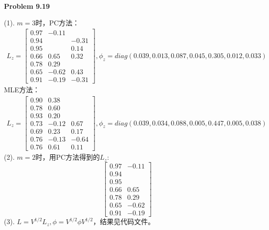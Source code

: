 \documentclass[UTF8,12pt]{article}
\newenvironment{problem}[2][Problem]
{ \begin{mdframed}[backgroundcolor=gray!20] \textbf{#1 #2}}
	{  \end{mdframed}}
\newenvironment{answer}
{%
}
{}
\newenvironment{eq}
{
	\begin{equation}
		\begin{aligned}\nonumber
}
{
		\end{aligned}
	\end{equation}
}
\begin{document}
\renewcommand{\qed}{\quad\qedsymbol}
\begin{problem}{9.19}
\end{problem}
\begin{answer}
	(1). $m=3$时，PC方法：
	\begin{eq}
		L_z = \begin{bmatrix}
			0.97 & -0.11 & \\
			0.94 &  & -0.31\\
			0.95 &  & 0.14\\
			0.66 & 0.65 & 0.32\\
			0.78 & 0.29 & \\
			0.65 & -0.62 & 0.43\\
			0.91 & -0.19 & -0.31
		\end{bmatrix},
		\phi_z = diag(0.039, 0.013, 0.087, 0.045, 0.305, 0.012, 0.033)
	\end{eq}MLE方法：
	\begin{eq}
		L_z = \begin{bmatrix}
			0.90 & 0.38 &\\
			0.78 & 0.60 &\\
			0.93 & 0.20 &\\
			0.73 & -0.12 & 0.67\\
			0.69 & 0.23 & 0.17\\
			0.76 & -0.13 & -0.64\\
			0.76 & 0.61 & 0.11
		\end{bmatrix},
		\phi_z = diag(0.039, 0.034, 0.088, 0.005, 0.447, 0.005, 0.038)
	\end{eq}
	(2). $m=2$时，用PC方法得到的$L_z$:
	$$
	\begin{bmatrix}
		0.97 & -0.11 \\
			0.94 &  \\
			0.95 &  \\
			0.66 & 0.65 \\
			0.78 & 0.29 \\
			0.65 & -0.62 \\
			0.91 & -0.19 
	\end{bmatrix}
	$$
	(3). $L=V^{1/2}L_z,\phi=V^{1/2}\phi V^{1/2}$，结果见代码文件。


\end{answer}
\end{document}
